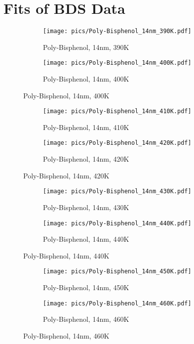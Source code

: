 \chapter{Fits of BDS Data}



\begin{figure}[!htb]
\centering
\begin{subfigure}[t]{.5\textwidth}
  \centering
  \texttt{[image: pics/Poly-Bisphenol\_14nm\_390K.pdf]}
  \caption{Poly-Bisphenol, 14nm, 390K}
  \label{fig:sub1}
\end{subfigure}%
\begin{subfigure}[t]{.5\textwidth}
  \centering
  \texttt{[image: pics/Poly-Bisphenol\_14nm\_400K.pdf]}
  \caption{Poly-Bisphenol, 14nm, 400K}
  \label{fig:sub2}
\end{subfigure}%
\end{figure}

\begin{figure}[!htb]
\centering
\begin{subfigure}[t]{.5\textwidth}
  \centering
  \texttt{[image: pics/Poly-Bisphenol\_14nm\_410K.pdf]}
  \caption{Poly-Bisphenol, 14nm, 410K}
  \label{fig:sub3}
\end{subfigure}%
\begin{subfigure}[t]{.5\textwidth}
  \centering
  \texttt{[image: pics/Poly-Bisphenol\_14nm\_420K.pdf]}
  \caption{Poly-Bisphenol, 14nm, 420K}
  \label{fig:sub4}
\end{subfigure}%
\end{figure}

\begin{figure}[!htb]
\centering
\begin{subfigure}[t]{.5\textwidth}
  \centering
  \texttt{[image: pics/Poly-Bisphenol\_14nm\_430K.pdf]}
  \caption{Poly-Bisphenol, 14nm, 430K}
  \label{fig:sub5}
\end{subfigure}%
\begin{subfigure}[t]{.5\textwidth}
  \centering
  \texttt{[image: pics/Poly-Bisphenol\_14nm\_440K.pdf]}
  \caption{Poly-Bisphenol, 14nm, 440K}
  \label{fig:sub6}
\end{subfigure}%
\end{figure}

\begin{figure}[!htb]
\centering
\begin{subfigure}[t]{.5\textwidth}
  \centering
  \texttt{[image: pics/Poly-Bisphenol\_14nm\_450K.pdf]}
  \caption{Poly-Bisphenol, 14nm, 450K}
  \label{14_450}
\end{subfigure}%
\begin{subfigure}[t]{.5\textwidth}
  \centering
  \texttt{[image: pics/Poly-Bisphenol\_14nm\_460K.pdf]}
  \caption{Poly-Bisphenol, 14nm, 460K}
  \label{fig:sub8}
\end{subfigure}%
\end{figure}

